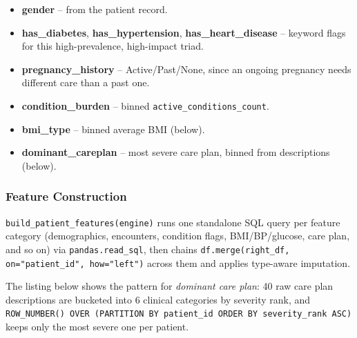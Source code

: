 \begin{itemize}
    \item \textbf{gender} -- from the patient record.
    \item \textbf{has\_diabetes}, \textbf{has\_hypertension}, \textbf{has\_heart\_disease} -- keyword flags for this high-prevalence, high-impact triad.
    \item \textbf{pregnancy\_history} -- Active/Past/None, since an ongoing pregnancy needs different care than a past one.
    \item \textbf{condition\_burden} -- binned \texttt{active\_conditions\_count}.
    \item \textbf{bmi\_type} -- binned average BMI (below).
    \item \textbf{dominant\_careplan} -- most severe care plan, binned from descriptions (below).
\end{itemize}

\subsubsection*{Feature Construction}
\label{ch:feature_construction}

\texttt{build\_patient\_features(engine)} runs one standalone SQL query per feature category (demographics, encounters, condition flags, BMI/BP/glucose, care plan, and so on) via \texttt{pandas.read\_sql}, then chains \texttt{df.merge(right\_df, on="patient\_id", how="left")} across them and applies type-aware imputation.

The listing below shows the pattern for \emph{dominant care plan}: 40 raw care plan descriptions are bucketed into 6 clinical categories by severity rank, and \texttt{ROW\_NUMBER() OVER (PARTITION BY patient\_id ORDER BY severity\_rank ASC)} keeps only the most severe one per patient.

